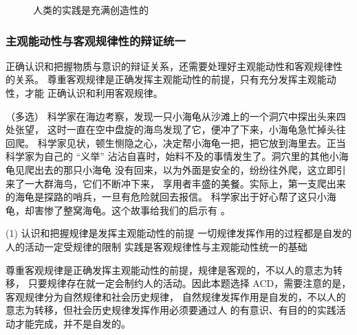 \documentclass[11pt, UTF8]{book} %
\begin{document}
\begin{example}
\begin{cmt}
\begin{figure}[H]
\begin{tikzpicture}[x=0.75pt,y=0.75pt,yscale=-1,xscale=1]
\end{tikzpicture}
\caption{人类的实践是充满创造性的}
        \end{figure}
    \end{cmt}
\end{example}



\subsubsection{主观能动性与客观规律性的辩证统一}

正确认识和把握物质与意识的辩证关系，还需要处理好主观能动性和客观规律性
的关系。
尊重客观规律是正确发挥主观能动性的前提，只有充分发挥主观能动性，才能
正确认识和利用客观规律。

\begin{example}
    （多选）
    科学家在海边考察，发现一只小海龟从沙滩上的一个洞穴中探出头来四处张望，
    这时一直在空中盘旋的海鸟发现了它，便冲了下来，小海龟急忙掉头往回爬。
    科学家见状，顿生恻隐之心，决定帮小海龟一把，把它放到海里去。正当科学家为自己的
    “义举” 沾沾自喜时，始料不及的事情发生了。洞穴里的其他小海龟见爬出去的那只小海龟
    没有回来，以为外面是安全的，纷纷往外爬，这立即引来了一大群海鸟，它们不断冲下来，
    享用者丰盛的美餐。实际上，第一支爬出来的海龟是探路的哨兵，一旦有危险就回去报信。
    科学家出于好心帮了这只小海龟，却害惨了整窝海龟。这个故事给我们的启示有 \underline{\qquad \qquad \qquad}。
    \begin{tasks}[label={\Alph*.}](1)
        \task 认识和把握规律是发挥主观能动性的前提
        \task 一切规律发挥作用的过程都是自发的
        \task 人的活动一定受规律的限制
        \task 实践是客观规律性与主观能动性统一的基础
    \end{tasks}
    \begin{cmt}
        尊重客观规律是正确发挥主观能动性的前提，规律是客观的，不以人的意志为转移，
        只要规律存在就一定会制约人的活动。因此本题选择 ACD，需要注意的是，
        客观规律分为自然规律和社会历史规律，
        自然规律发挥作用是自发的，不以人的意志为转移，但社会历史规律发挥作用必须要通过人
        的有意识、有目的的实践活动才能完成，并不是自发的。
    \end{cmt}
\end{example}
\end{document}
